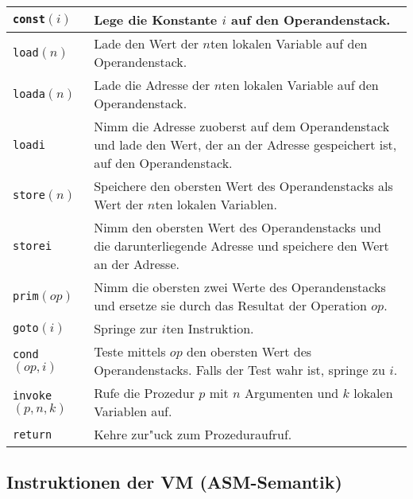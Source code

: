 \documentclass[german,10pt, a4paper, twocolumn]{scrartcl}
\theoremstyle{definition}
\theoremstyle{remark}
\begin{document}
\small
\begin{tabular}{|l|p{4.2cm}|}
	\hline
	\tt{const}$(i)$ &		Lege die Konstante $i$ auf den Operandenstack.\\ \hline
	\tt{load}$(n)$ &		Lade den Wert der $n$ten lokalen Variable auf den Operandenstack.\\ \hline
	\tt{loada}$(n)$ &		Lade die Adresse der $n$ten lokalen Variable auf den Operandenstack.\\ \hline
	\tt{loadi} &			Nimm die Adresse zuoberst auf dem Operandenstack und lade den Wert, der an der Adresse gespeichert ist, auf den Operandenstack.\\ \hline
	\tt{store}$(n)$ &		Speichere den obersten Wert des Operandenstacks als Wert der $n$ten lokalen Variablen.\\ \hline
	\tt{storei} &			Nimm den obersten Wert des Operandenstacks und die darunterliegende Adresse und speichere den Wert an der Adresse.\\ \hline
	\tt{prim}$(op)$ &		Nimm die obersten zwei Werte des Operandenstacks und ersetze sie durch das Resultat der Operation $op$. \\ \hline
	\tt{goto}$(i)$ &		Springe zur $i$ten Instruktion.\\ \hline
	\tt{cond}$(op,i)$ &		Teste mittels $op$ den obersten Wert des Operandenstacks. Falls der Test wahr ist, springe zu $i$.\\ \hline
	\tt{invoke}$(p,n,k)$ &		Rufe die Prozedur $p$ mit $n$ Argumenten und $k$ lokalen Variablen auf.\\ \hline
	\tt{return} &			Kehre zur"uck zum Prozeduraufruf.\\ \hline
\end{tabular}
\normalsize

\subsection{Instruktionen der VM (ASM-Semantik)}
\end{document}
